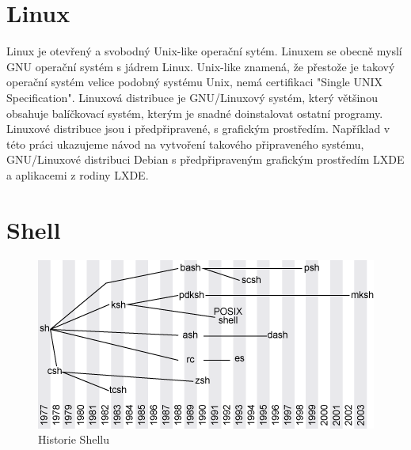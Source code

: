 \documentclass[thesis=M,czech]{FITthesis}[2012/06/26]
\begin{document}


\section{Linux}
Linux je otevřený a svobodný Unix-like operační sytém. Linuxem se obecně myslí GNU operační systém s jádrem Linux. Unix-like znamená, že přestože je takový operační systém velice podobný systému Unix, nemá certifikaci "Single UNIX Specification". Linuxová distribuce je GNU/Linuxový systém, který většinou obsahuje balíčkovací systém, kterým je snadné doinstalovat ostatní programy. Linuxové distribuce jsou i předpřipravené, s grafickým prostředím. Například v této práci ukazujeme návod na vytvoření takového připraveného systému, GNU/Linuxové distribuci Debian s předpřipraveným grafickým prostředím LXDE a aplikacemi z rodiny LXDE.






\section{Shell}

\begin{figure}[htb]\centering
	\includegraphics[width=\textwidth]{./images/tmp_shell_history}
	\caption{Historie Shellu}
	\label{fig:shell_history}
\end{figure}
\end{document}
